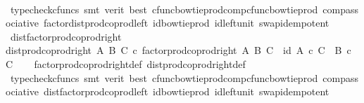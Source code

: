 \begin{isabellebody}
\ \ \isamarkupfalse%
\ {\isacharparenleft}{\kern0pt}typecheck{\isacharunderscore}{\kern0pt}cfuncs{\isacharcomma}{\kern0pt}\ smt\ {\isacharparenleft}{\kern0pt}verit{\isacharcomma}{\kern0pt}\ best{\isacharparenright}{\kern0pt}\ cfunc{\isacharunderscore}{\kern0pt}bowtie{\isacharunderscore}{\kern0pt}prod{\isacharunderscore}{\kern0pt}comp{\isacharunderscore}{\kern0pt}cfunc{\isacharunderscore}{\kern0pt}bowtie{\isacharunderscore}{\kern0pt}prod\ comp{\isacharunderscore}{\kern0pt}associative{}\ factor{\isacharunderscore}{\kern0pt}dist{\isacharunderscore}{\kern0pt}prod{\isacharunderscore}{\kern0pt}coprod{\isacharunderscore}{\kern0pt}left\ id{\isacharunderscore}{\kern0pt}bowtie{\isacharunderscore}{\kern0pt}prod\ id{\isacharunderscore}{\kern0pt}left{\isacharunderscore}{\kern0pt}unit{}\ swap{\isacharunderscore}{\kern0pt}idempotent{\isacharparenright}{\kern0pt}%
\endisatagproof
{\isafoldproof}%
%
\isadelimproof
\isanewline
%
\endisadelimproof
\ \ \ \isanewline
{}\isamarkupfalse%
\ dist{\isacharunderscore}{\kern0pt}factor{\isacharunderscore}{\kern0pt}prod{\isacharunderscore}{\kern0pt}coprod{\isacharunderscore}{\kern0pt}right{\isacharcolon}{\kern0pt}\isanewline
{\isachardoublequoteopen}dist{\isacharunderscore}{\kern0pt}prod{\isacharunderscore}{\kern0pt}coprod{\isacharunderscore}{\kern0pt}right\ A\ B\ C\ {\isasymcirc}\isactrlsub c\ factor{\isacharunderscore}{\kern0pt}prod{\isacharunderscore}{\kern0pt}coprod{\isacharunderscore}{\kern0pt}right\ A\ B\ C\ {\isacharequal}{\kern0pt}\ id\ {\isacharparenleft}{\kern0pt}{\isacharparenleft}{\kern0pt}A\ {\isasymtimes}\isactrlsub c\ C{\isacharparenright}{\kern0pt}\ {\isasymCoprod}\ {\isacharparenleft}{\kern0pt}B\ {\isasymtimes}\isactrlsub c\ C{\isacharparenright}{\kern0pt}{\isacharparenright}{\kern0pt}{\isachardoublequoteclose}\isanewline
%
\isadelimproof
\ \ %
\endisadelimproof
%
\isatagproof
{}\isamarkupfalse%
\ factor{\isacharunderscore}{\kern0pt}prod{\isacharunderscore}{\kern0pt}coprod{\isacharunderscore}{\kern0pt}right{\isacharunderscore}{\kern0pt}def\ dist{\isacharunderscore}{\kern0pt}prod{\isacharunderscore}{\kern0pt}coprod{\isacharunderscore}{\kern0pt}right{\isacharunderscore}{\kern0pt}def\isanewline
\ \ \isamarkupfalse%
\ {\isacharparenleft}{\kern0pt}typecheck{\isacharunderscore}{\kern0pt}cfuncs{\isacharcomma}{\kern0pt}\ smt\ {\isacharparenleft}{\kern0pt}verit{\isacharcomma}{\kern0pt}\ best{\isacharparenright}{\kern0pt}\ cfunc{\isacharunderscore}{\kern0pt}bowtie{\isacharunderscore}{\kern0pt}prod{\isacharunderscore}{\kern0pt}comp{\isacharunderscore}{\kern0pt}cfunc{\isacharunderscore}{\kern0pt}bowtie{\isacharunderscore}{\kern0pt}prod\ comp{\isacharunderscore}{\kern0pt}associative{}\ dist{\isacharunderscore}{\kern0pt}factor{\isacharunderscore}{\kern0pt}prod{\isacharunderscore}{\kern0pt}coprod{\isacharunderscore}{\kern0pt}left\ id{\isacharunderscore}{\kern0pt}bowtie{\isacharunderscore}{\kern0pt}prod\ id{\isacharunderscore}{\kern0pt}left{\isacharunderscore}{\kern0pt}unit{}\ swap{\isacharunderscore}{\kern0pt}idempotent{\isacharparenright}{\kern0pt}%

\end{isabellebody}
